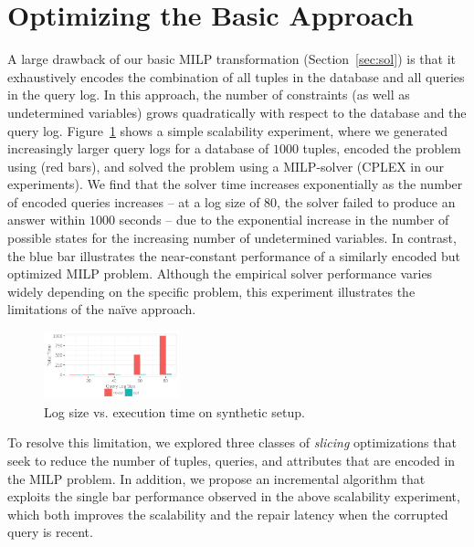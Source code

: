 
\section{Optimizing the Basic Approach}
\label{sec:opt}

A large drawback of our basic MILP transformation (Section~\ref{sec:sol}) is
that it exhaustively encodes the combination of all tuples in the database and all queries
in the query log.  In this approach, the number of constraints (as well as undetermined variables) 
grows quadratically with respect to the database and the query log.
Figure~\ref{fig:querysize_vs_time} shows a simple scalability experiment, where we generated increasingly 
larger query logs for a database of $1000$ tuples, encoded the problem using \naive (red bars), 
and solved the problem using a MILP-solver (CPLEX in our experiments).
We find that the solver time increases exponentially as the number of encoded queries increases --
at a log size of $80$, the solver failed to produce an answer within $1000$ seconds --
due to the exponential increase in the number of possible states for the increasing number of undetermined variables.
In contrast, the blue bar illustrates the near-constant performance of a similarly encoded but optimized MILP problem. 
Although the empirical solver performance varies widely depending on the specific problem, 
this experiment illustrates the limitations of the na\"ive approach.

\begin{figure}[h]
    \centering
        \includegraphics[width=0.35\textwidth]{figures/qsize_time_badscale}
    \caption{Log size vs. execution time on synthetic setup. }
    \label{fig:querysize_vs_time}
\end{figure}

To resolve this limitation, we explored three classes of \emph{slicing} optimizations that seek to
reduce the number of tuples, queries, and attributes that are encoded in the MILP problem.
In addition, we propose an incremental algorithm that exploits the single bar performance observed
in the above scalability experiment, which both improves the scalability and the repair latency
when the corrupted query is recent.  





